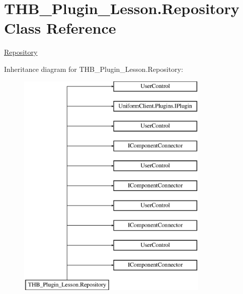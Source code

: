 \hypertarget{class_t_h_b___plugin___lesson_1_1_repository}{}\section{T\+H\+B\+\_\+\+Plugin\+\_\+\+Lesson.\+Repository Class Reference}
\label{class_t_h_b___plugin___lesson_1_1_repository}


\mbox{\hyperlink{class_t_h_b___plugin___lesson_1_1_repository}{Repository}}  


Inheritance diagram for T\+H\+B\+\_\+\+Plugin\+\_\+\+Lesson.\+Repository\+:\begin{figure}[H]
\begin{center}
\leavevmode
\includegraphics[height=11.000000cm]{d1/df2/class_t_h_b___plugin___lesson_1_1_repository}
\end{center}
\end{figure}
